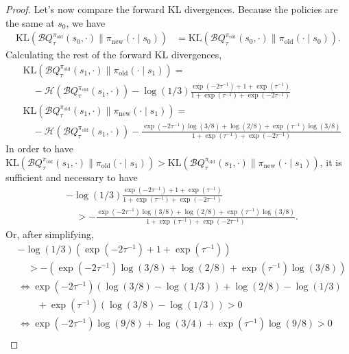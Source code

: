 \documentclass[twoside,11pt]{article}
\newcommand{\KL}{\mathrm{KL}}
\newcommand{\boltzmannQ}{\mathcal{B}Q}
\newcommand{\entropy}{\mathcal{H}}
\newcommand{\pinew}{{\pi_\mathrm{new}}}
\newcommand{\piold}{{\pi_\mathrm{old}}}
\begin{document}
\begin{proof}
Let's now compare the forward KL divergences. Because the policies are the same at $s_0$, we have 
\begin{align*}
    \KL(\boltzmannQ_\tau^\piold(s_0, \cdot) \parallel \pinew(\cdot \mid s_0)) &= \KL(\boltzmannQ_\tau^\piold(s_0, \cdot) \parallel \piold(\cdot \mid s_0)).
\end{align*}
Calculating the rest of the forward KL divergences,
\begin{align*}
    &\KL(\boltzmannQ_\tau^\piold(s_1, \cdot) \parallel \piold(\cdot \mid s_1)) =\\
    &\quad-\entropy(\boltzmannQ_\tau^\piold(s_1, \cdot)) - \log(1/3) \frac{\exp(-2\tau^{-1}) + 1 + \exp(\tau^{-1})}{1 + \exp(\tau^{-1}) + \exp(-2\tau^{-1})}   \\
    &\KL(\boltzmannQ_\tau^\piold(s_1, \cdot) \parallel \pinew(\cdot \mid s_1)) =\\
    &\quad-\entropy(\boltzmannQ_\tau^\piold(s_1, \cdot)) - \frac{\exp(-2\tau^{-1}) \log(3/8)+ \log(2/8) + \exp(\tau^{-1}) \log(3/8)}{1 + \exp(\tau^{-1}) + \exp(-2\tau^{-1})}   
\end{align*}
In order to have $\KL(\boltzmannQ_\tau^\piold(s_1, \cdot) \parallel \piold(\cdot \mid s_1)) > \KL(\boltzmannQ_\tau^\piold(s_1, \cdot) \parallel \pinew(\cdot \mid s_1))$, it is sufficient and necessary to have
\begin{align*}
    &- \log(1/3) \frac{\exp(-2\tau^{-1}) + 1 + \exp(\tau^{-1})}{1 + \exp(\tau^{-1}) + \exp(-2\tau^{-1})} \\
    &\quad > - \frac{\exp(-2\tau^{-1}) \log(3/8)+ \log(2/8) + \exp(\tau^{-1}) \log(3/8)}{1 + \exp(\tau^{-1}) + \exp(-2\tau^{-1})}.
\end{align*}
Or, after simplifying,
\begin{align*}
    &- \log(1/3) (\exp(-2\tau^{-1}) + 1 + \exp(\tau^{-1})) \\ 
    &\quad > - (\exp(-2\tau^{-1}) \log(3/8)+ \log(2/8) + \exp(\tau^{-1}) \log(3/8))\\
    &\iff \exp(-2\tau^{-1})(\log(3/8) - \log(1/3)) + \log(2/8) - \log(1/3)\\
    &\quad\quad+ \exp(\tau^{-1})(\log(3/8) - \log(1/3)) > 0\\
    &\iff \exp(-2\tau^{-1})\log(9/8) + \log(3/4) + \exp(\tau^{-1})\log(9/8) > 0\\

\end{align*}
\end{proof}
\end{document}
